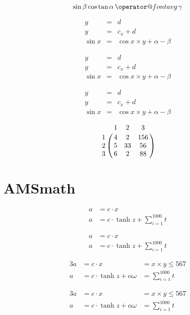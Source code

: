 \documentclass[12pt,ngerman,parskip=half]{scrartcl}
\makeatletter
\newcommand{\avg}{\mathop{\operator@font avg}}
\makeatother
\begin{document}
\begin{equation}
\sin \beta \cos \tan \alpha \avg \gamma
\end{equation}

\begin{eqnarray} %
y &=& d \\
y &=& c_x +d \\
\sin x &=& \cos x \times y + \alpha - \beta
\end{eqnarray}

\begin{eqnarray*} %
y &=& d \\
y &=& c_x +d \\
\sin x &=& \cos x \times y + \alpha - \beta
\end{eqnarray*}

\[
\begin{array}{lcr} %
y &=& d \\
y &=& c_x +d \\
\sin x &=& \cos x \times y + \alpha - \beta
\end{array}
\]

\[ %
\bordermatrix{
   & 1 & 2 & 3 \cr
1 & 4 & 2 & 156 \cr
2 & 5 & 33 & 56 \cr
3 & 6 & 2 & 88 \cr
}
\]

\section{AMSmath}

\begin{align} %
a &= c \cdot x \\
a &= c \cdot \tanh z + \sum_{i=1}^{1000} t
\end{align}

\begin{align*} %
a &= c \cdot x \\
a &= c \cdot \tanh z + \sum_{i=1}^{1000} t
\end{align*}

\begin{alignat}{3}
a &= c \cdot x &= x\times y \leq 567 \\
a &= c \cdot \tanh z + \alpha\omega &= \sum_{i=1}^{1000} t
\end{alignat}

\begin{alignat*}{3}
a &= c \cdot x &= x\times y \leq 567 \\
a &= c \cdot \tanh z + \alpha\omega &= \sum_{i=1}^{1000} t
\end{alignat*}
\end{document}
